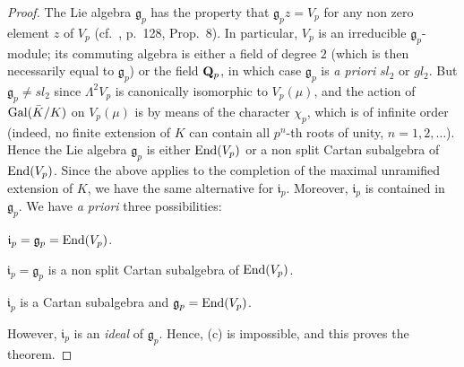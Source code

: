 \begin{proof}
The Lie algebra $\mathfrak{g}_p$ has the property that
$\mathfrak{g}_pz=V_p$ for any non zero element $z$ of $V_p$
(cf.~\cite{serre-galpdiv}, p.~128, Prop.~8). In particular, $V_p$ is an
irreducible $\mathfrak{g}_p$-module; its commuting algebra is either a
field of degree $2$ (which is then necessarily equal to
$\mathfrak{g}_p$) or the field $\mathbf{Q}_p$, in which case $\mathfrak{g}_p$ is
\emph{a priori} $sl_2$ or $gl_2$. But $\mathfrak{g}_p\neq sl_2$ since
$\Lambda^2V_p$ is canonically isomorphic to $V_p(\mu)$, and the action
of $\mathrm{Gal}(\bar K/K)$ on $V_p(\mu)$ is by means of the character $\chi_p$,
which is of infinite order (indeed, no finite extension of $K$ can
contain all $p^n$-th roots of unity, $n=1,2,\dotsc$). Hence the Lie
algebra $\mathfrak{g}_p$ is either $\mathrm{End}(V_p)$ or a non split Cartan
subalgebra of $\mathrm{End}(V_p)$. Since the above applies to the completion of
the maximal unramified extension of $K$, we have the same alternative
for $\mathfrak{i}_p$. Moreover, $\mathfrak{i}_p$ is contained in
$\mathfrak{g}_p$. We have \emph{a priori} three possibilities:
\begin{alist}
\item $\mathfrak{i}_p=\mathfrak{g}_p=\mathrm{End}(V_p)$.
\item $\mathfrak{i}_p=\mathfrak{g}_p$ is a non split Cartan subalgebra
of $\mathrm{End}(V_p)$.
\item $\mathfrak{i}_p$ is a Cartan subalgebra and
$\mathfrak{g}_p=\mathrm{End}(V_p)$.
\end{alist}
However, $\mathfrak{i}_p$ is an \emph{ideal} of $\mathfrak{g}_p$. Hence,
(c) is impossible, and this proves the theorem.
\end{proof}

